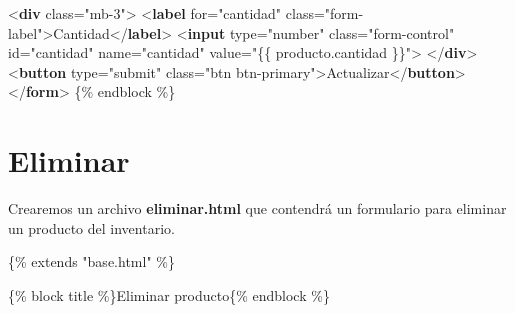 \documentclass[
  a4paper,
  DIV=11,
  numbers=noendperiod,
  onepage,
  openany]{scrreprt}
\newenvironment{Shaded}{\begin{snugshade}}{\end{snugshade}}
\newcommand{\DataTypeTok}[1]{\textcolor[rgb]{0.68,0.00,0.00}{#1}}
\newcommand{\KeywordTok}[1]{\textcolor[rgb]{0.00,0.23,0.31}{\textbf{#1}}}
\newcommand{\NormalTok}[1]{\textcolor[rgb]{0.00,0.23,0.31}{#1}}
\newcommand{\OperatorTok}[1]{\textcolor[rgb]{0.37,0.37,0.37}{#1}}
\newcommand{\OtherTok}[1]{\textcolor[rgb]{0.00,0.23,0.31}{#1}}
\newcommand{\StringTok}[1]{\textcolor[rgb]{0.13,0.47,0.30}{#1}}
\begin{document}
\begin{tcolorbox}
\begin{Shaded}
\begin{Highlighting}[]
    \DataTypeTok{\textless{}}\KeywordTok{div}\OtherTok{ class}\OperatorTok{=}\StringTok{"mb{-}3"}\DataTypeTok{\textgreater{}}
        \DataTypeTok{\textless{}}\KeywordTok{label}\OtherTok{ for}\OperatorTok{=}\StringTok{"cantidad"}\OtherTok{ class}\OperatorTok{=}\StringTok{"form{-}label"}\DataTypeTok{\textgreater{}}\NormalTok{Cantidad}\DataTypeTok{\textless{}/}\KeywordTok{label}\DataTypeTok{\textgreater{}}
        \DataTypeTok{\textless{}}\KeywordTok{input}\OtherTok{ type}\OperatorTok{=}\StringTok{"number"}\OtherTok{ class}\OperatorTok{=}\StringTok{"form{-}control"}\OtherTok{ id}\OperatorTok{=}\StringTok{"cantidad"}\OtherTok{ name}\OperatorTok{=}\StringTok{"cantidad"}\OtherTok{ value}\OperatorTok{=}\StringTok{"\{\{ producto.cantidad \}\}"}\DataTypeTok{\textgreater{}}
    \DataTypeTok{\textless{}/}\KeywordTok{div}\DataTypeTok{\textgreater{}}
    \DataTypeTok{\textless{}}\KeywordTok{button}\OtherTok{ type}\OperatorTok{=}\StringTok{"submit"}\OtherTok{ class}\OperatorTok{=}\StringTok{"btn btn{-}primary"}\DataTypeTok{\textgreater{}}\NormalTok{Actualizar}\DataTypeTok{\textless{}/}\KeywordTok{button}\DataTypeTok{\textgreater{}}
\DataTypeTok{\textless{}/}\KeywordTok{form}\DataTypeTok{\textgreater{}}
\NormalTok{\{\% endblock \%\}}
\end{Highlighting}
\end{Shaded}

\section{Eliminar}\label{eliminar}

Crearemos un archivo \textbf{eliminar.html} que contendrá un formulario
para eliminar un producto del inventario.

\begin{Shaded}
\begin{Highlighting}[]
\NormalTok{\{\% extends "base.html" \%\}}

\NormalTok{\{\% block title \%\}Eliminar producto\{\% endblock \%\}}


\end{Highlighting}
\end{Shaded}
\end{tcolorbox}
\end{document}

